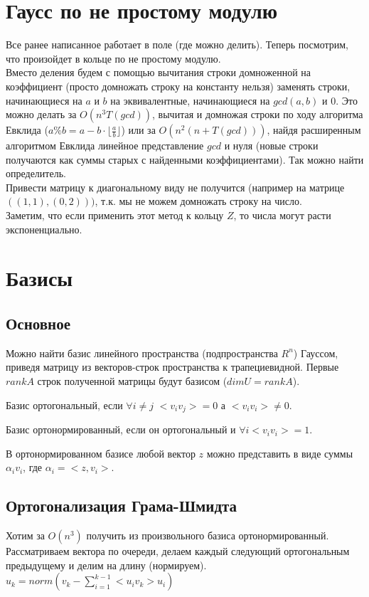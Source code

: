 \section{Гаусс по не простому модулю}
Все ранее написанное работает в поле (где можно делить). Теперь посмотрим, что произойдет в кольце по не простому модулю.\\
Вместо деления будем с помощью вычитания строки домноженной на коэффициент (просто домножать строку на константу нельзя) заменять строки, начинающиеся на $a$ и $b$ на эквивалентные, начинающиеся на $gcd(a, b)$ и $0$. Это можно делать за $O(n^3T(gcd))$, вычитая и домножая строки по ходу алгоритма Евклида ($a\%b=a-b\cdot \lfloor\frac{a}{b}\rfloor$) или за $O(n^2(n+T(gcd)))$, найдя расширенным алгоритмом Евклида линейное представление $gcd$ и нуля (новые строки получаются как суммы старых с найденными коэффициентами). Так можно найти определитель.\\ Привести матрицу к диагональному виду не получится (например на матрице $((1, 1), (0, 2)))$, т.к. мы не можем домножать строку на число.\\
Заметим, что если применить этот метод к кольцу $Z$, то числа могут расти экспоненциально.
\section{Базисы}
\subsection{Основное}
Можно найти базис линейного пространства (подпространства $R^n$) Гауссом, приведя матрицу из векторов-строк пространства к трапециевидной. Первые $rank A$ строк полученной матрицы будут базисом ($dim U = rank A$).\\
\begin{Def}
Базис ортогональный, если $\forall i \ne j$ $<v_iv_j> = 0$ а $<v_iv_i> \ne 0$.
\end{Def}
\begin{Def}
Базис ортонормированный, если он ортогональный и $\forall i <v_iv_i>=1$.
\end{Def}
В ортонормированном базисе любой вектор $z$ можно представить в виде суммы $\alpha_iv_i$, где $\alpha_i = <z, v_i>$.\\
\subsection{Ортогонализация Грама-Шмидта}
Хотим за $O(n^3)$ получить из произвольного базиса ортонормированный. Рассматриваем вектора по очереди, делаем каждый следующий ортогональным предыдущему и делим на длину (нормируем). $u_k = norm(v_k-\sum_{i=1}^{k-1}{<u_iv_k> u_i})$